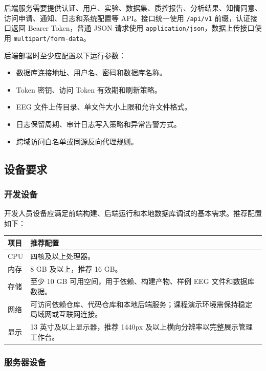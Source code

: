后端服务需要提供认证、用户、实验、数据集、质控报告、分析结果、知情同意、访问申请、通知、日志和系统配置等 API。接口统一使用 \texttt{/api/v1} 前缀，认证接口返回 Bearer Token，普通 JSON 请求使用 \texttt{application/json}，数据上传接口使用 \texttt{multipart/form-data}。

后端部署时至少应配置以下运行参数：

\begin{itemize}
  \item 数据库连接地址、用户名、密码和数据库名称。
  \item Token 密钥、访问 Token 有效期和刷新策略。
  \item EEG 文件上传目录、单文件大小上限和允许文件格式。
  \item 日志保留周期、审计日志写入策略和异常告警方式。
  \item 跨域访问白名单或同源反向代理规则。
\end{itemize}

\subsection{设备要求}

\subsubsection{开发设备}

开发人员设备应满足前端构建、后端运行和本地数据库调试的基本需求。推荐配置如下：

\begin{longtable}{|p{38mm}|p{82mm}|}
\hline
\textbf{项目} & \textbf{推荐配置} \\
\hline
CPU & 四核及以上处理器。 \\
\hline
内存 & 8 GB 及以上，推荐 16 GB。 \\
\hline
存储 & 至少 10 GB 可用空间，用于依赖、构建产物、样例 EEG 文件和数据库数据。 \\
\hline
网络 & 可访问依赖仓库、代码仓库和本地后端服务；课程演示环境需保持稳定局域网或互联网连接。 \\
\hline
显示 & 13 英寸及以上显示器，推荐 1440px 及以上横向分辨率以完整展示管理工作台。 \\
\hline
\end{longtable}

\subsubsection{服务器设备}

